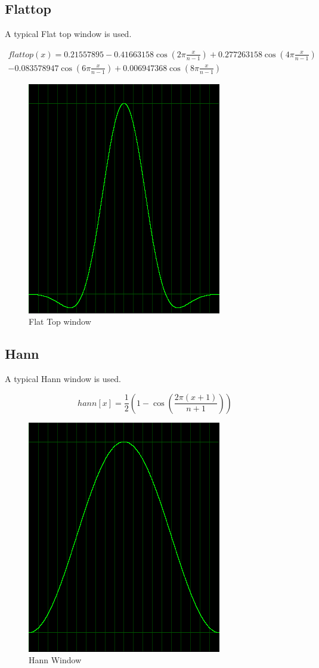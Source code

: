 \documentclass[10pt,a4paper]{report}
\begin{document}
\subsection{Flattop}
A typical Flat top window is used.

\begin{align*}
flattop(x)=0.21557895 - 0.41663158\cos(2\pi\frac{x}{n-1})+ 0.277263158\cos(4\pi\frac{x}{n-1})\\
- 0.083578947\cos(6\pi\frac{x}{n-1}) + 0.006947368\cos(8\pi\frac{x}{n-1})
\end{align*}

\begin{figure}[H]
	\centering
	\includegraphics[width=0.4\linewidth]{plots/window-flattop.png}
	\caption[Flat Top window]{Flat Top window}
	\label{fig:window-flattop}
\end{figure}


\subsection{Hann}
A typical Hann window is used.

\begin{equation}
hann[x] = \frac{1}{2}(1 - \cos(\frac{2\pi(x+1)}{n+1}))
\end{equation}

\begin{figure}[H]
	\centering
	\includegraphics[width=0.4\linewidth]{plots/window-hann.png}
	\caption[Hann Window]{Hann Window}
	\label{fig:window-hann}
\end{figure}
\end{document}
